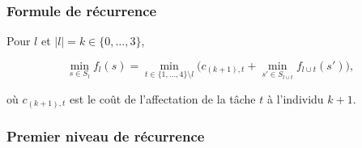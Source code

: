 \documentclass{beamer}
\begin{document}
\begin{frame}
  \frametitle{Formule de récurrence}

  Pour $l$ et $|l| = k \in \{0,\dots,3\}$,  
  
  \[ \min_{s \in S_l} f_l(s) =
  \min_{t \in \{1,\dots,4\} \setminus l}
  \big( c_{(k+1),t} + \min_{s' \in S_{l \cup t}} f_{l \cup t}(s') \big), \]

  où $c_{(k+1),t}$ est le coût de l'affectation de la tâche $t$
  à l'individu $k+1$. 
  
\end{frame}

\begin{frame}
  \frametitle{Premier niveau de récurrence}


\end{frame}
\end{document}
